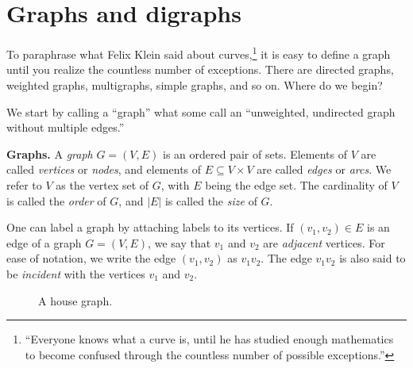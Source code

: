 
\section{Graphs and digraphs}
\label{sec:introduction:graphs_digraphs}

To paraphrase what Felix Klein said about curves,\footnote{
``Everyone knows what a curve is, until he has studied enough
mathematics to become confused through the countless number of
possible exceptions.''}
it is easy to define a graph until you realize the countless number of
exceptions. There are directed graphs, weighted graphs, multigraphs,
simple graphs, and so on. Where do we begin?

We start by calling a ``graph'' what some call an ``unweighted,
undirected graph without multiple edges.''

\begin{definition}
\textbf{Graphs.}
A \emph{graph} $G = (V, E)$ is an ordered pair of sets. Elements of
$V$ are called \emph{vertices} or \emph{nodes}, and elements of
$E \subseteq V \times V$ are called \emph{edges} or \emph{arcs}. We
refer to $V$ as the vertex set of $G$, with $E$ being the edge
set. The cardinality of $V$ is called the \emph{order} of $G$, and
$|E|$ is called the \emph{size} of $G$.
\end{definition}

One can label a graph by attaching labels to its vertices. If $(v_1,
v_2) \in E$ is an edge of a graph $G = (V, E)$, we say that $v_1$ and
$v_2$ are \emph{adjacent} vertices. For ease of notation, we write the
edge $(v_1, v_2)$ as $v_1 v_2$. The edge $v_1 v_2$ is also said to be
\emph{incident} with the vertices $v_1$ and $v_2$.

\begin{figure}[!htbp]
\centering
{}
\caption{A house graph.}
\label{fig:introduction:house_graph}
\end{figure}


